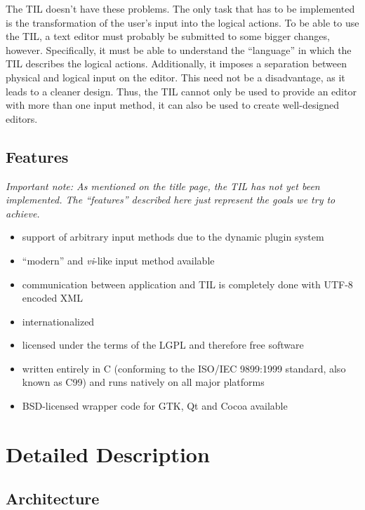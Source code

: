 \documentclass[a4paper]{article}
\begin{document}
The TIL doesn't have these problems. The only task that has to be implemented is the transformation of the user's input into the logical actions. To be able to use the TIL, a text editor must probably be submitted to some bigger changes, however. Specifically, it must be able to understand the ``language'' in which the TIL describes the logical actions. Additionally, it imposes a separation between physical and logical input on the editor. This need not be a disadvantage, as it leads to a cleaner design. Thus, the TIL cannot only be used to provide an editor with more than one input method, it can also be used to create well-designed editors.

\subsection{Features}

\emph{Important note: As mentioned on the title page, the TIL has not yet been implemented. The ``features'' described here just represent the goals we try to achieve.}

\begin{itemize}
\item support of arbitrary input methods due to the dynamic plugin system
\item ``modern'' and \emph{vi}-like input method available
\item communication between application and TIL is completely done with UTF-8 encoded XML
\item internationalized
\item licensed under the terms of the LGPL and therefore free software
\item written entirely in C (conforming to the ISO/IEC 9899:1999 standard, also known as C99) and runs natively on all major platforms
\item BSD-licensed wrapper code for GTK, Qt and Cocoa available
\end{itemize}

\section{Detailed Description}

\subsection{Architecture}
\end{document}
